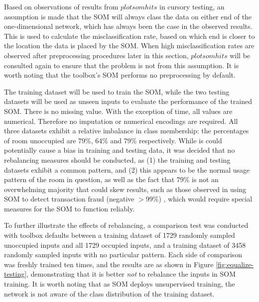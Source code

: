 \documentclass[10pt, oneside]{article}
\begin{document}
Based on observations of results from $plotsomhits$ in cursory testing, an assumption is made that the SOM will always class the data on either end of the one-dimensional network, which has always been the case in the observed results. This is used to calculate the misclassification rate, based on which end is closer to the location the data is placed by the SOM. When high misclassification rates are observed after preprocessing procedures later in this section, $plotsomhits$ will be consulted again to ensure that the problem is not from this assumption. It is worth noting that the toolbox's SOM performs no preprocessing by default.

The training dataset will be used to train the SOM, while the two testing datasets will be used as unseen inputs to evaluate the performance of the trained SOM. There is no missing value. With the exception of time, all values are numerical. Therefore no imputation or numerical encodings are required. All three datasets exhibit a relative imbalance in class membership: the percentages of room unoccupied are 79\%, 64\% and 79\% respectively. While is could potentially cause a bias in training and testing data, it was decided that no rebalancing measures should be conducted, as (1) the training and testing datasets exhibit a common pattern, and (2) this appears to be the normal usage pattern of the room in question, as well as the fact that 79\% is not an overwhelming majority that could skew results, such as those observed in using SOM to detect transaction fraud (negative $>$99\%) \cite{almendra2014using}, which would require special measures for the SOM to function reliably. 

To further illustrate the effects of rebalancing, a comparison test was conducted with toolbox defaults between a training dataset of 1729 randomly sampled unoccupied inputs and all 1729 occupied inputs, and a training dataset of 3458 randomly sampled inputs with no particular pattern. Each side of comparison was freshly trained ten times, and the results are as shown in Figure \ref{fig:equalize-testing}, demonstrating that it is better \textit{not} to rebalance the inputs in SOM training. It is worth noting that as SOM deploys unsupervised training, the network is not aware of the class distribution of the training dataset.
\end{document}
